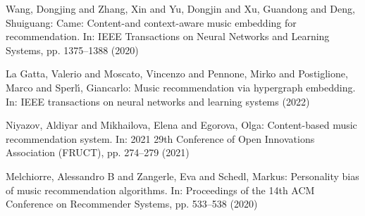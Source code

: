 \documentclass[runningheads,a4paper]{llncs}
\begin{document}

\begin{thebibliography}{4}

 Wang, Dongjing and Zhang, Xin and Yu, Dongjin and Xu, Guandong and Deng, Shuiguang: 
Came: Content-and context-aware music embedding for recommendation. In: IEEE Transactions on Neural Networks and Learning Systems,
pp. 1375--1388 (2020)

 La Gatta, Valerio and Moscato, Vincenzo and Pennone, Mirko and Postiglione, Marco and Sperl{\'\i}, Giancarlo:
Music recommendation via hypergraph embedding. In: IEEE transactions on neural networks and learning systems (2022)

 Niyazov, Aldiyar and Mikhailova, Elena and Egorova, Olga:
Content-based music recommendation system. In: 2021 29th Conference of Open Innovations Association (FRUCT),
pp. 274--279 (2021)

 Melchiorre, Alessandro B and Zangerle, Eva and Schedl, Markus:
Personality bias of music recommendation algorithms. In: Proceedings of the 14th ACM Conference on Recommender Systems, 
pp. 533--538 (2020)







\end{thebibliography}
\end{document}
